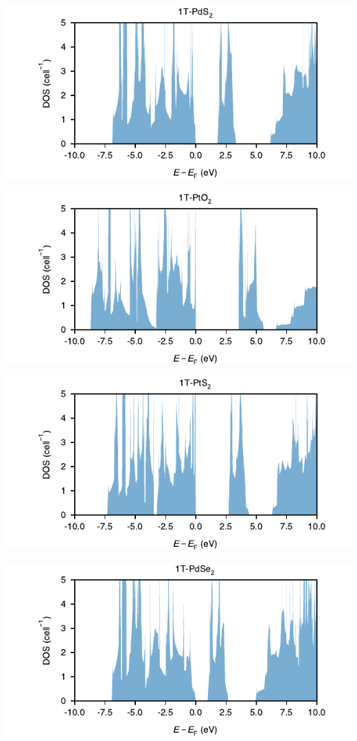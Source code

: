\begin{center}
\includegraphics[width=.9\linewidth]{img/SI_figs/1T-PdS2-DOS.pdf}
\end{center}
\begin{center}
\includegraphics[width=.9\linewidth]{img/SI_figs/1T-PtO2-DOS.pdf}
\end{center}
\begin{center}
\includegraphics[width=.9\linewidth]{img/SI_figs/1T-PtS2-DOS.pdf}
\end{center}
\begin{center}
\includegraphics[width=.9\linewidth]{img/SI_figs/1T-PdSe2-DOS.pdf}
\end{center}

